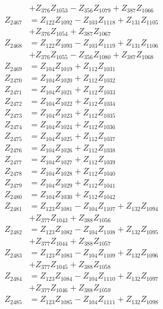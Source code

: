 \begin{multicols}{2}
\begin{align}
&+ Z_{376}Z_{1053} - Z_{356}Z_{1079} + Z_{387}Z_{1066} \nonumber \\
Z_{2467} &= Z_{122}Z_{1092} - Z_{103}Z_{1118} + Z_{131}Z_{1105}  \nonumber \\
&+ Z_{376}Z_{1054} + Z_{387}Z_{1067} \nonumber \\
Z_{2468} &= Z_{122}Z_{1093} - Z_{103}Z_{1119} + Z_{131}Z_{1106}  \nonumber \\
&+ Z_{376}Z_{1055} - Z_{356}Z_{1080} + Z_{387}Z_{1068} \nonumber \\
Z_{2469} &= Z_{104}Z_{1019} + Z_{112}Z_{1031} \nonumber \\
Z_{2470} &= Z_{104}Z_{1020} + Z_{112}Z_{1032} \nonumber \\
Z_{2471} &= Z_{104}Z_{1021} + Z_{112}Z_{1033} \nonumber \\
Z_{2472} &= Z_{104}Z_{1022} + Z_{112}Z_{1034} \nonumber \\
Z_{2473} &= Z_{104}Z_{1023} + Z_{112}Z_{1035} \nonumber \\
Z_{2474} &= Z_{104}Z_{1024} + Z_{112}Z_{1036} \nonumber \\
Z_{2475} &= Z_{104}Z_{1025} + Z_{112}Z_{1037} \nonumber \\
Z_{2476} &= Z_{104}Z_{1026} + Z_{112}Z_{1038} \nonumber \\
Z_{2477} &= Z_{104}Z_{1027} + Z_{112}Z_{1039} \nonumber \\
Z_{2478} &= Z_{104}Z_{1028} + Z_{112}Z_{1040} \nonumber \\
Z_{2479} &= Z_{104}Z_{1029} + Z_{112}Z_{1041} \nonumber \\
Z_{2480} &= Z_{104}Z_{1030} + Z_{112}Z_{1042} \nonumber \\
Z_{2481} &= Z_{123}Z_{1081} - Z_{104}Z_{1107} + Z_{132}Z_{1094}  \nonumber \\
&+ Z_{377}Z_{1043} + Z_{388}Z_{1056} \nonumber \\
Z_{2482} &= Z_{123}Z_{1082} - Z_{104}Z_{1108} + Z_{132}Z_{1095}  \nonumber \\
&+ Z_{377}Z_{1044} + Z_{388}Z_{1057} \nonumber \\
Z_{2483} &= Z_{123}Z_{1083} - Z_{104}Z_{1109} + Z_{132}Z_{1096}  \nonumber \\
&+ Z_{377}Z_{1045} + Z_{388}Z_{1058} \nonumber \\
Z_{2484} &= Z_{123}Z_{1084} - Z_{104}Z_{1110} + Z_{132}Z_{1097}  \nonumber \\
&+ Z_{377}Z_{1046} + Z_{388}Z_{1059} \nonumber \\
Z_{2485} &= Z_{123}Z_{1085} - Z_{104}Z_{1111} + Z_{132}Z_{1098}  \nonumber \\

\end{align}
\end{multicols}
